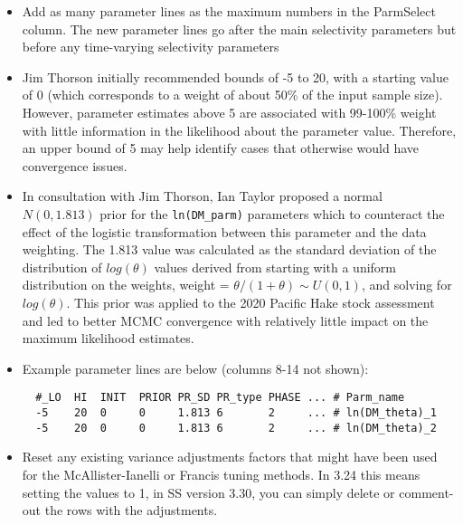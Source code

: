 \begin{itemize}
	\item Add as many parameter lines as the maximum numbers in the ParmSelect column. The new parameter lines go after the main selectivity parameters but before any time-varying selectivity parameters
	
	\item Jim Thorson initially recommended bounds of -5 to 20, with a starting value of 0
    (which corresponds to a weight of about 50\% of the input sample size). However, parameter estimates above 5 are associated with 99-100\% weight with little information in the likelihood about the parameter value. Therefore, an upper bound of 5 may help identify cases that otherwise would have convergence issues.

  \item In consultation with Jim Thorson, Ian Taylor proposed a normal $N(0, 1.813)$ prior for the \texttt{ln(DM\_parm)} parameters which to counteract the effect of the logistic transformation between this parameter and the data weighting. The 1.813 value was calculated as the standard deviation of the distribution of $log(\theta)$ values derived from starting with a uniform distribution on the weights, weight = $\theta/(1+\theta) \sim U(0,1)$, and solving for $log(\theta)$. This prior was applied to the 2020 Pacific Hake stock assessment \citep{grandin_status_2020} and led to better MCMC convergence with relatively little impact on the maximum likelihood estimates.
	
	\item Example parameter lines are below (columns 8-14 not shown): 
    \begin{small}
      \begin{minipage}{\linewidth} 
\begin{verbatim}
  #_LO  HI  INIT  PRIOR PR_SD PR_type PHASE ... # Parm_name
  -5    20  0     0     1.813 6       2     ... # ln(DM_theta)_1
  -5    20  0     0     1.813 6       2     ... # ln(DM_theta)_2
\end{verbatim}
      \end{minipage}
    \end{small}
	
	\item Reset any existing variance adjustments factors that might have been used for the McAllister-Ianelli or Francis tuning methods. In 3.24 this means setting the values to 1, in SS version 3.30, you can simply delete or comment-out the rows with the adjustments.
\end{itemize}

